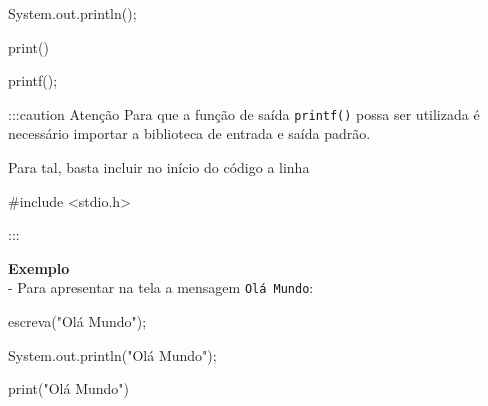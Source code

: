 \documentclass[
  letterpaper,
  DIV=11,
  numbers=noendperiod]{scrreprt}
\newenvironment{Shaded}{\begin{snugshade}}{\end{snugshade}}
\newcommand{\AttributeTok}[1]{\textcolor[rgb]{0.40,0.45,0.13}{#1}}
\newcommand{\BuiltInTok}[1]{\textcolor[rgb]{0.00,0.23,0.31}{#1}}
\newcommand{\FunctionTok}[1]{\textcolor[rgb]{0.28,0.35,0.67}{#1}}
\newcommand{\ImportTok}[1]{\textcolor[rgb]{0.00,0.46,0.62}{#1}}
\newcommand{\NormalTok}[1]{\textcolor[rgb]{0.00,0.23,0.31}{#1}}
\newcommand{\OperatorTok}[1]{\textcolor[rgb]{0.37,0.37,0.37}{#1}}
\newcommand{\PreprocessorTok}[1]{\textcolor[rgb]{0.68,0.00,0.00}{#1}}
\newcommand{\StringTok}[1]{\textcolor[rgb]{0.13,0.47,0.30}{#1}}
\begin{document}
\begin{Shaded}
\begin{Highlighting}[]
\NormalTok{System}\OperatorTok{.}\AttributeTok{out}\OperatorTok{.}\FunctionTok{println}\NormalTok{()}\OperatorTok{;}
\end{Highlighting}
\end{Shaded}

\begin{Shaded}
\begin{Highlighting}[]
\BuiltInTok{print}\NormalTok{()}
\end{Highlighting}
\end{Shaded}

\begin{Shaded}
\begin{Highlighting}[]
\NormalTok{printf}\OperatorTok{();}
\end{Highlighting}
\end{Shaded}

:::caution Atenção Para que a função de saída \texttt{printf()} possa
ser utilizada é necessário importar a biblioteca de entrada e saída
padrão.

Para tal, basta incluir no início do código a linha

\begin{Shaded}
\begin{Highlighting}[]
\PreprocessorTok{\#include }\ImportTok{\textless{}stdio.h\textgreater{}}
\end{Highlighting}
\end{Shaded}

:::

\textbf{Exemplo}\\
- Para apresentar na tela a mensagem \texttt{Olá\ Mundo}:

\begin{Shaded}
\begin{Highlighting}[]
\NormalTok{escreva}\OperatorTok{(}\StringTok{"Olá Mundo"}\OperatorTok{);}
\end{Highlighting}
\end{Shaded}

\begin{Shaded}
\begin{Highlighting}[]
\NormalTok{System}\OperatorTok{.}\AttributeTok{out}\OperatorTok{.}\FunctionTok{println}\NormalTok{(}\StringTok{"Olá Mundo"}\NormalTok{)}\OperatorTok{;}
\end{Highlighting}
\end{Shaded}

\begin{Shaded}
\begin{Highlighting}[]
\BuiltInTok{print}\NormalTok{(}\StringTok{"Olá Mundo"}\NormalTok{)}
\end{Highlighting}
\end{Shaded}
\end{document}
